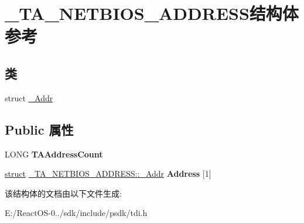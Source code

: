\hypertarget{struct___t_a___n_e_t_b_i_o_s___a_d_d_r_e_s_s}{}\section{\+\_\+\+T\+A\+\_\+\+N\+E\+T\+B\+I\+O\+S\+\_\+\+A\+D\+D\+R\+E\+S\+S结构体 参考}
\label{struct___t_a___n_e_t_b_i_o_s___a_d_d_r_e_s_s}
\subsection*{类}
\begin{DoxyCompactItemize}
\item 
struct \hyperlink{struct___t_a___n_e_t_b_i_o_s___a_d_d_r_e_s_s_1_1___addr}{\+\_\+\+Addr}
\end{DoxyCompactItemize}
\subsection*{Public 属性}
\begin{DoxyCompactItemize}
\item 
\mbox{\label{struct___t_a___n_e_t_b_i_o_s___a_d_d_r_e_s_s_ad9b13f5d006dd3f50df0a9c964d58e9f}} 
L\+O\+NG {\bfseries T\+A\+Address\+Count}
\item 
\mbox{\label{struct___t_a___n_e_t_b_i_o_s___a_d_d_r_e_s_s_ae894b83d7ed7e7cc907ec42fb97a09f0}} 
\hyperlink{interfacestruct}{struct} \hyperlink{struct___t_a___n_e_t_b_i_o_s___a_d_d_r_e_s_s_1_1___addr}{\+\_\+\+T\+A\+\_\+\+N\+E\+T\+B\+I\+O\+S\+\_\+\+A\+D\+D\+R\+E\+S\+S\+::\+\_\+\+Addr} {\bfseries Address} \mbox{[}1\mbox{]}
\end{DoxyCompactItemize}


该结构体的文档由以下文件生成\+:\begin{DoxyCompactItemize}
\item 
E\+:/\+React\+O\+S-\/0../sdk/include/psdk/tdi.\+h\end{DoxyCompactItemize}
